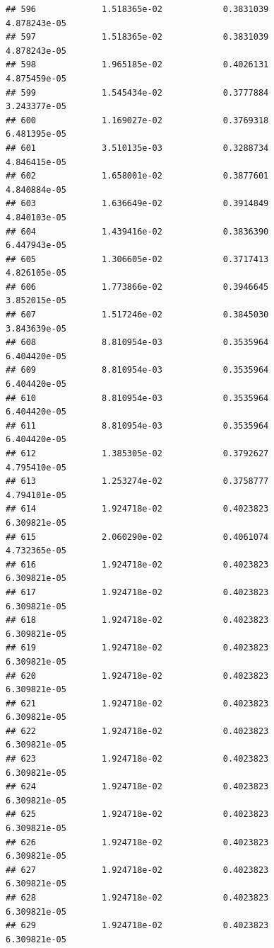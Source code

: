 \documentclass[
]{article}
\begin{document}
\begin{verbatim}
## 596             1.518365e-02            0.3831039            4.878243e-05
## 597             1.518365e-02            0.3831039            4.878243e-05
## 598             1.965185e-02            0.4026131            4.875459e-05
## 599             1.545434e-02            0.3777884            3.243377e-05
## 600             1.169027e-02            0.3769318            6.481395e-05
## 601             3.510135e-03            0.3288734            4.846415e-05
## 602             1.658001e-02            0.3877601            4.840884e-05
## 603             1.636649e-02            0.3914849            4.840103e-05
## 604             1.439416e-02            0.3836390            6.447943e-05
## 605             1.306605e-02            0.3717413            4.826105e-05
## 606             1.773866e-02            0.3946645            3.852015e-05
## 607             1.517246e-02            0.3845030            3.843639e-05
## 608             8.810954e-03            0.3535964            6.404420e-05
## 609             8.810954e-03            0.3535964            6.404420e-05
## 610             8.810954e-03            0.3535964            6.404420e-05
## 611             8.810954e-03            0.3535964            6.404420e-05
## 612             1.385305e-02            0.3792627            4.795410e-05
## 613             1.253274e-02            0.3758777            4.794101e-05
## 614             1.924718e-02            0.4023823            6.309821e-05
## 615             2.060290e-02            0.4061074            4.732365e-05
## 616             1.924718e-02            0.4023823            6.309821e-05
## 617             1.924718e-02            0.4023823            6.309821e-05
## 618             1.924718e-02            0.4023823            6.309821e-05
## 619             1.924718e-02            0.4023823            6.309821e-05
## 620             1.924718e-02            0.4023823            6.309821e-05
## 621             1.924718e-02            0.4023823            6.309821e-05
## 622             1.924718e-02            0.4023823            6.309821e-05
## 623             1.924718e-02            0.4023823            6.309821e-05
## 624             1.924718e-02            0.4023823            6.309821e-05
## 625             1.924718e-02            0.4023823            6.309821e-05
## 626             1.924718e-02            0.4023823            6.309821e-05
## 627             1.924718e-02            0.4023823            6.309821e-05
## 628             1.924718e-02            0.4023823            6.309821e-05
## 629             1.924718e-02            0.4023823            6.309821e-05

\end{verbatim}
\end{document}
